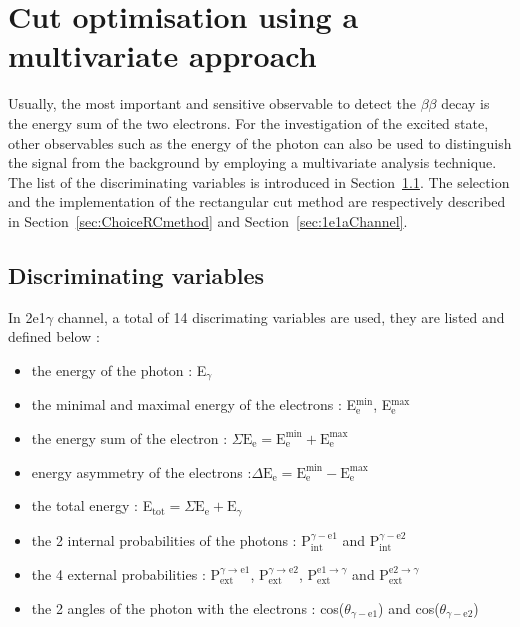 \documentclass[main.tex]{subfiles}
\begin{document}
\FloatBarrier



\section{Cut optimisation using a multivariate approach}\label{sec:CutOptimisation}


\NI Usually, the most important and sensitive observable to detect the $\beta\beta$ decay is the energy sum of the two electrons. For the investigation of the excited state, other observables such as the energy of the photon can also be used to distinguish the signal from the background by employing a multivariate analysis technique. The list of the discriminating variables is introduced in Section~\ref{sec:discriminatingVariables}. The selection and the implementation of the rectangular cut method are respectively described in Section~\ref{sec:ChoiceRCmethod} and Section~\ref{sec:1e1aChannel}.


\subsection{Discriminating variables}\label{sec:discriminatingVariables}


In 2e1$\gamma$ channel, a total of 14 discrimating variables are used, they are listed and defined below : 


\begin{itemize}
\item the energy of the photon : E$_{\gamma}$
\item the minimal and maximal energy of the electrons : E$_\text{e}^{\text{min}}$, E$_\text{e}^{\text{max}}$
\item the energy sum of the electron : $\Sigma\text{E}_\text{e} = \text{E}_\text{e}^{\text{min}} +  \text{E}_\text{e}^{\text{max}}$
\item energy asymmetry of the electrons :$\Delta\text{E}_\text{e} = \text{E}_\text{e}^{\text{min}} -  \text{E}_\text{e}^{\text{max}}$
\item the total energy : E$_{\text{tot}} = \Sigma\text{E}_{\text{e}} + \text{E}_{\gamma}$
\item the 2 internal probabilities of the photons : P$_{\text{int}}^{\gamma-\text{e1}}$ and  P$_{\text{int}}^{\gamma-\text{e2}}$
\item the 4 external probabilities : P$_{\text{ext}}^{\gamma \rightarrow \text{e1}}$, P$_{\text{ext}}^{\gamma \rightarrow \text{e2}}$, P$_{\text{ext}}^{ \text{e1} \rightarrow\gamma}$ and P$_{\text{ext}}^{ \text{e2} \rightarrow\gamma}$
\item the 2 angles of the photon with the electrons : cos($\theta_{\gamma-\text{e1}}$) and cos($\theta_{\gamma-\text{e2}}$)
\end{itemize}
\end{document}
